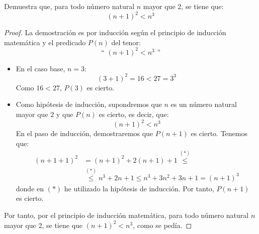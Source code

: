 \begin{ejercicio}\label{ej:SigCuadradoMenorCubo}
    Demuestra que, para todo número natural $n$ mayor que 2, se tiene que:
    $$(n+1)^2 < n^3$$
    
    \begin{proof}
        La demostración es por inducción según el principio de inducción matemática y el predicado $P(n)$ del tenor:
        \begin{equation*}
            \text{`` }(n+1)^2 < n^3\text{ ''}
        \end{equation*}
        \begin{itemize}
            \item En el caso base, $n=3$:
                \begin{equation*}
                    (3+1)^2 = 16 < 27 = 3^3
                \end{equation*}
                Como $16 < 27$, $P(3)$ es cierto.

            \item Como hipótesis de inducción, supondremos que $n$ es un número natural mayor que 2 y que $P(n)$ es cierto, es decir, que:
                \begin{equation*}
                    (n+1)^2 < n^3
                \end{equation*}
                En el paso de inducción, demostraremos que $P(n+1)$ es cierto. Tenemos que:
                \begin{align*}
                    (n+1+1)^2 &= (n+1)^2 + 2(n+1) + 1 \stackrel{(\ast)}{\leq} \\ &\stackrel{(\ast)}{\leq}
                    n^3 + 2n + 1 \leq n^3 +3n^2 + 3n + 1 = (n+1)^3
                \end{align*}
                donde en $(\ast)$ he utilizado la hipótesis de inducción. Por tanto, $P(n+1)$ es cierto.
        \end{itemize}
        Por tanto, por el principio de inducción matemática, para todo número natural $n$ mayor que 2, se tiene que $(n+1)^2 < n^3$, como se pedía.
    \end{proof}
\end{ejercicio}

